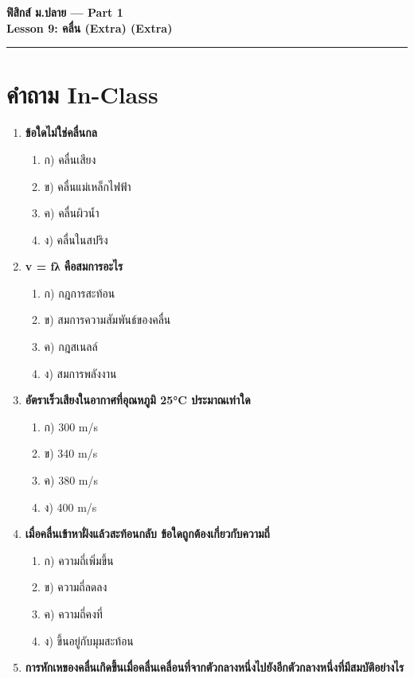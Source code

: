 \documentclass[12pt]{article}
\begin{document}
\begin{center}
{\LARGE\textbf{ฟิสิกส์ ม.ปลาย — Part 1}}\\[0.3em]
{\Large\textbf{Lesson 9: คลื่น (Extra) (Extra)}}\\[0.5em]
\rule{0.8\linewidth}{0.5pt}
\end{center}
\section*{คำถาม In-Class}
\begin{enumerate}
\item \textbf{ข้อใดไม่ใช่คลื่นกล}
\begin{enumerate}
\item ก) คลื่นเสียง
\item ข) คลื่นแม่เหล็กไฟฟ้า
\item ค) คลื่นผิวน้ำ
\item ง) คลื่นในสปริง
\end{enumerate}
\item \textbf{v = fλ คือสมการอะไร}
\begin{enumerate}
\item ก) กฎการสะท้อน
\item ข) สมการความสัมพันธ์ของคลื่น
\item ค) กฎสเนลล์
\item ง) สมการพลังงาน
\end{enumerate}
\item \textbf{อัตราเร็วเสียงในอากาศที่อุณหภูมิ 25°C ประมาณเท่าใด}
\begin{enumerate}
\item ก) 300 m/s
\item ข) 340 m/s
\item ค) 380 m/s
\item ง) 400 m/s
\end{enumerate}
\item \textbf{เมื่อคลื่นเข้าหาฝั่งแล้วสะท้อนกลับ ข้อใดถูกต้องเกี่ยวกับความถี่}
\begin{enumerate}
\item ก) ความถี่เพิ่มขึ้น
\item ข) ความถี่ลดลง
\item ค) ความถี่คงที่
\item ง) ขึ้นอยู่กับมุมสะท้อน
\end{enumerate}
\item \textbf{การหักเหของคลื่นเกิดขึ้นเมื่อคลื่นเคลื่อนที่จากตัวกลางหนึ่งไปยังอีกตัวกลางหนึ่งที่มีสมบัติอย่างไร}
\begin{enumerate}

\end{enumerate}
\end{enumerate}
\end{document}
